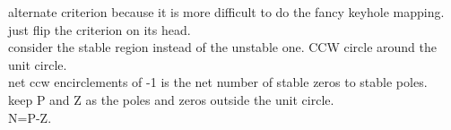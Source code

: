 \documentclass{article}
\begin{document}
alternate criterion because it is more difficult to do the fancy keyhole mapping.\\
just flip the criterion on its head.\\
consider the stable region instead of the unstable one. CCW circle around the unit circle.\\
net ccw encirclements of -1 is the net number of stable zeros to stable poles.\\
keep P and Z as the poles and zeros outside the unit circle.\\
N=P-Z.\\
\end{document}

